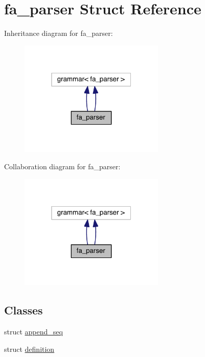 \hypertarget{structfa__parser}{\section{fa\+\_\+parser Struct Reference}
\label{structfa__parser}
}


Inheritance diagram for fa\+\_\+parser\+:
\nopagebreak
\begin{figure}[H]
\begin{center}
\leavevmode
\includegraphics[width=196pt]{structfa__parser__inherit__graph}
\end{center}
\end{figure}


Collaboration diagram for fa\+\_\+parser\+:
\nopagebreak
\begin{figure}[H]
\begin{center}
\leavevmode
\includegraphics[width=196pt]{structfa__parser__coll__graph}
\end{center}
\end{figure}
\subsection*{Classes}
\begin{DoxyCompactItemize}
\item 
struct \hyperlink{structfa__parser_1_1append__seq}{append\+\_\+seq}
\item 
struct \hyperlink{structfa__parser_1_1definition}{definition}
\end{DoxyCompactItemize}
